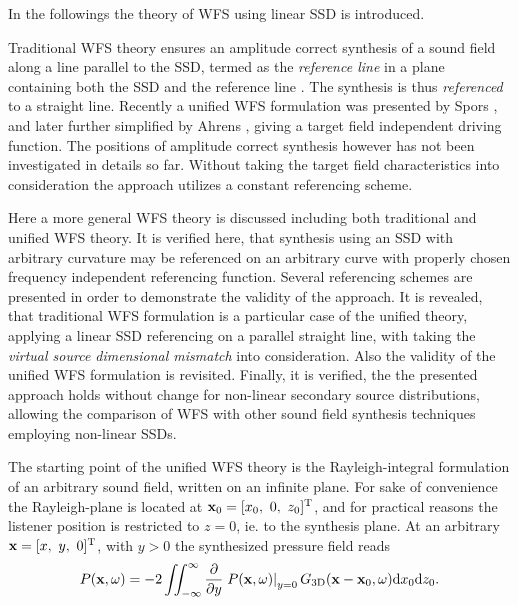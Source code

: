 In the followings the theory of WFS using linear SSD is introduced.

Traditional WFS theory ensures an amplitude correct synthesis of a sound field along a line parallel to the SSD, termed as the \emph{reference line} in a plane containing both the SSD and the reference line \cite{Berkhout1993:Acoustic_control_by_WFS, Berkhout1988, Verheijen1997:phd, Vogel1993:phd, Start1997:phd}. The synthesis is thus \emph{referenced} to a straight line. Recently a unified WFS formulation was presented by Spors \cite{Spors2008:WFSrevisited}, and later further simplified by Ahrens \cite{Ahrens2010phd, Ahrens2012}, giving a target field independent driving function. The positions of amplitude correct synthesis however has not been investigated in details so far. Without taking the target field characteristics into consideration the approach utilizes a constant referencing scheme.

Here a more general WFS theory is discussed including both traditional and unified WFS theory.
It is verified here, that synthesis using an SSD with arbitrary curvature may be referenced on an arbitrary curve with properly chosen frequency independent referencing function. Several referencing schemes are presented in order to demonstrate the validity of the approach. It is revealed, that traditional WFS formulation is a particular case of the unified theory, applying a linear SSD referencing on a parallel straight line, with taking the \emph{virtual source dimensional mismatch} into consideration.
Also the validity of the unified WFS formulation is revisited.
Finally, it is verified, the the presented approach holds without change for non-linear secondary source distributions, allowing the comparison of WFS with other sound field synthesis techniques employing non-linear SSDs. 

\vspace{3mm}
The starting point of the unified WFS theory is the Rayleigh-integral formulation of an arbitrary sound field, written on an infinite plane. For sake of convenience the Rayleigh-plane is located at $\mathbf{x}_0 = [x_0,\ 0,\ z_0]^{\mathrm{T}}$, and for practical reasons the listener position is restricted to $z=0$, ie. to the synthesis plane. At an arbitrary $\mathbf{x} = [x,\ y,\ 0]^{\mathrm{T}}$, with $y>0$ the synthesized pressure field reads
\begin{equation}
P(\mathbf{x},\omega) = -2 \iint_{-\infty}^{\infty} \frac{\partial}{\partial y} \left. P(\mathbf{x},\omega) \right|_{y = 0} G_{3\mathrm{D}}(\mathbf{x} - \mathbf{x}_0,\omega) \mathrm{d} x_0 \mathrm{d} z_0.
\label{Eq:Theory:3D_Rayleigh}
\end{equation}

